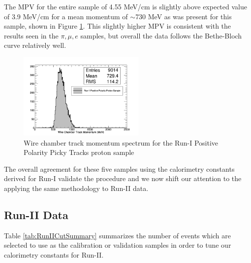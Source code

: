 The MPV for the entire sample of 4.55 MeV/cm is slightly above expected value of 3.9 MeV/cm for a mean momentum of $\sim$730 MeV as was present for this sample, shown in Figure \ref{fig:Run1PosPickyTrkProtonMomentumSpec}. This slightly higher MPV is consistent with the results seen in the $\pi, \mu, e$ samples, but overall the data follows the Bethe-Bloch curve relatively well.

\begin{figure}[htb]
\centering
\includegraphics[width=0.55\textwidth]{images/WCTrkMomentumRun1PosProton.png}
\caption{Wire chamber track momentum spectrum for the Run-I Positive Polarity Picky Tracks proton sample  }
\label{fig:Run1PosPickyTrkProtonMomentumSpec}
\end{figure}

The overall agreement for these five samples using the calorimetry constants derived for Run-I validate the procedure and we now shift our attention to the applying the same methodology to Run-II data.

\newpage
\subsection{Run-II Data}\label{sec:RunII}
Table \ref{tab:RunIICutSummary} summarizes the number of events which are selected to use as the calibration or validation samples in order to tune our calorimetry constants for Run-II.

